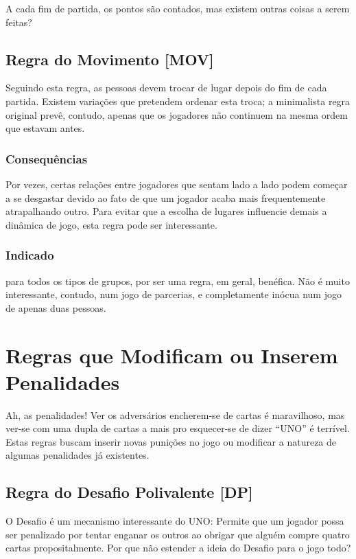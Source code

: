 A cada fim de partida, os pontos são contados, mas existem outras coisas a serem feitas?

\subsection{Regra do Movimento [MOV]}

Seguindo esta regra, as pessoas devem trocar de lugar depois do fim de cada partida. Existem variações que pretendem ordenar esta troca; a minimalista regra original prevê, contudo, apenas que os jogadores não continuem na mesma ordem que estavam antes.

\subsubsection{Consequências}

Por vezes, certas relações entre jogadores que sentam lado a lado podem começar a se desgastar devido ao fato de que um jogador acaba mais frequentemente atrapalhando outro. Para evitar que a escolha de lugares influencie demais a dinâmica de jogo, esta regra pode ser interessante. 

\subsubsection{Indicado} 

para todos os tipos de grupos, por ser uma regra, em geral, benéfica. Não é muito interessante, contudo, num jogo de parcerias, e completamente inócua num jogo de apenas duas pessoas. 

\section{Regras que Modificam ou Inserem Penalidades}

Ah, as penalidades! Ver os adversários encherem-se de cartas é maravilhoso, mas ver-se com uma dupla de cartas a mais pro esquecer-se de dizer ``UNO'' é terrível. Estas regras buscam inserir novas punições no jogo ou modificar a natureza de algumas penalidades já existentes.

\subsection{Regra do Desafio Polivalente [DP]}

\label{desafiopolivalente}

O Desafio é um mecanismo interessante do UNO: Permite que um jogador possa ser penalizado por tentar enganar os outros ao obrigar que alguém compre quatro cartas propositalmente. Por que não estender a ideia do Desafio para o jogo todo?

